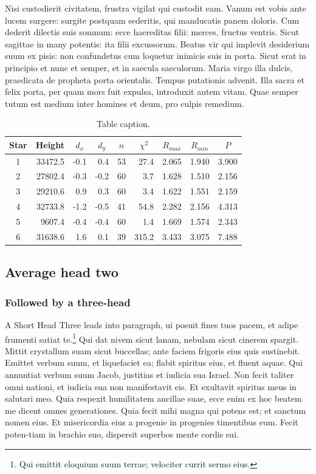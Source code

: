 \documentclass{infor}
\theoremstyle{remark}
\begin{document}
Nisi custodierit civitatem, frustra vigilat qui custodit eam. Vanum
est vobis ante lucem surgere: surgite postquam sederitis, qui
manducatis panem doloris. Cum dederit dilectis suis somnum: ecce
haereditas filii: merces, fructus ventris. Sicut sagittae in many
potentis: ita filii excussorum. Beatus vir qui implevit desiderium
suum ex pisis: non confundetus cum loquetur inimicis suis in porta.
Sicut erat in principio et nunc et semper, et in saecula saeculorum.
Maria virgo illa dulcis, praedicata de propheta porta orientalis.
Tempus putationis advenit.  Illa sacra et felix porta, per quam mors
fuit expulsa, introduxit autem vitam.  Quae semper tutum est medium
inter homines et deum, pro culpis remedium.


\begin{table}
\caption{Table caption.}\label{tbl-2}
\begin{tabular*}{\textwidth}{@{\extracolsep{\fill}}crrrrrrrr@{}}
\hline
Star & Height & \multicolumn{1}{c}{$d_{x}$} &
\multicolumn{1}{c}{$d_{y}$} &
\multicolumn{1}{c}{$n$} &
\multicolumn{1}{c}{$\chi^2$} &
\multicolumn{1}{c}{$R_{max}$} &
\multicolumn{1}{c}{$R_{min}$} &
\multicolumn{1}{c}{$P$}  \\
\hline
1 &33472.5 &-0.1 &0.4  &53 &27.4  &2.065  &1.940 &3.900\\
2 &27802.4 &-0.3 &-0.2 &60 &3.7   &1.628  &1.510 &2.156\\
3 &29210.6 &0.9  &0.3  &60 &3.4   &1.622  &1.551 &2.159\\
4 &32733.8 &-1.2 &-0.5 &41 &54.8  &2.282  &2.156 &4.313\\
5 & 9607.4 &-0.4 &-0.4 &60 &1.4   &1.669  &1.574 &2.343\\
6 &31638.6 &1.6  &0.1  &39 &315.2 & 3.433 &3.075 &7.488\\
\hline
\end{tabular*}
\end{table}


\subsection{Average head two}

\subsubsection{Followed by a three-head}

A Short Head Three leads into paragraph, ui posuit fines tuos pacem,
et adipe frumenti satiat te.\footnote{Qui emittit eloquium suum terrae;
velociter currit sermo eius.} Qui dat nivem sicut lanam, nebulam
sicut cinerem spargit. Mittit crystallum suam sicut buccellas; ante
faciem frigoris eius quis sustinebit. Emittet verbum suum, et
liquefaciet ea; flabit spiritus eius, et fluent aquae. Qui annuntiat
verbum suum Jacob, justitias et iudicia sua Israel. Non fecit taliter omni
nationi, et iudicia sua non manifestavit eis. Et exultavit spiritus meus
in salutari meo.  Quia respexit humilitatem ancillae suae, ecce enim ex
hoc beatem me dicent omnes generationes. Quia fecit mihi magna qui potens
est; et sanctum nomen eius. Et misericordia eius a progenie in progenies
timentibus eum. Fecit poten-tiam in brachio suo, dispersit superbos mente
cordis sui.
\end{document}
